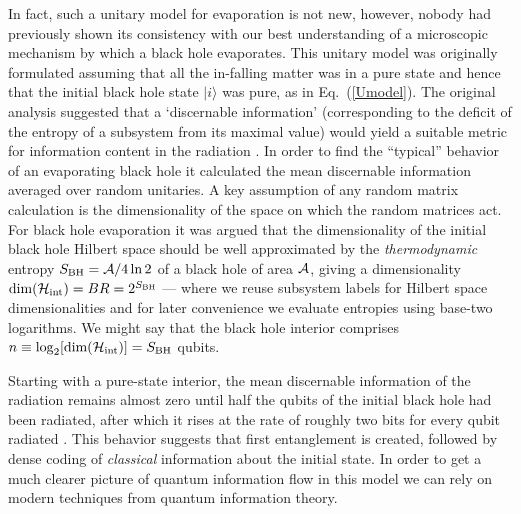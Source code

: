 \documentclass[twocolumn,aps,prl]{revtex4}
\begin{document}
In fact, such a unitary model for evaporation is not new, however, nobody
had previously shown its consistency with our best understanding of a
microscopic mechanism by which a black hole evaporates. This unitary
model was originally formulated \cite{Page93} assuming that all the
in-falling matter was in a pure state and hence that the initial black
hole state $|i\rangle$ was pure, as in Eq.~(\ref{Umodel}). The original
analysis suggested that a `discernable information' (corresponding
to the deficit of the entropy of a subsystem from its maximal value)
would yield a suitable metric for information content in the
radiation \cite{Page93}. In order to find the ``typical'' behavior
of an evaporating black hole it calculated the mean discernable
information averaged over random unitaries. A key assumption of
any random matrix calculation is the dimensionality of the space on
which the random matrices act. For black hole evaporation it was
argued \cite{Page93,Susskind93} that the dimensionality of the initial black
hole Hilbert space should be well approximated by the
{\it thermodynamic\/} entropy $S_{\text{BH}}={\cal A}/4\ln 2$ of a black
hole of area ${\cal A}$, giving a dimensionality
$\text{dim}({\cal H}_\text{int})= BR= 2^{S_{\text{BH}}}$
--- where we reuse subsystem labels for Hilbert space dimensionalities
and for later convenience we evaluate entropies using base-two logarithms.
We might say that the black hole interior comprises
$n\equiv\log_2[\text{dim}({\cal H}_\text{int})]=S_{\text{BH}}$ qubits.

Starting with a pure-state interior, the mean discernable information
of the radiation remains almost zero until half the qubits of the
initial black hole had been radiated, after which it rises at
the rate of roughly two bits for every qubit radiated \cite{Page93}.
This behavior suggests that first entanglement is created, followed by
dense coding of {\it classical\/} information about the
initial state. In order to get a much clearer picture of quantum
information flow in this model we can rely on modern techniques from
quantum information theory.
\end{document}
